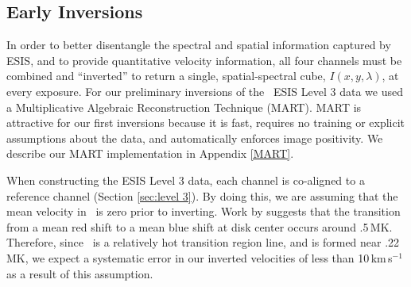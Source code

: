     
    
    \subsection{Early Inversions} \label{sec:inversions}
    	In order to better disentangle the spectral and spatial information captured by ESIS, and to provide quantitative velocity information, all four channels must be combined and ``inverted'' to return a single, spatial-spectral cube, $I(x,y,\lambda)$, at every exposure.
    	For our preliminary inversions of the \ov \  ESIS Level 3 data we used a Multiplicative Algebraic Reconstruction Technique (MART).
    	MART is attractive for our first inversions because it is fast, requires no training or explicit assumptions about the data, and automatically enforces image  positivity.
    	We describe our MART implementation in Appendix \ref{MART}.
    	
    	When constructing the ESIS Level 3 data, each channel is co-aligned to a reference channel (Section \ref{sec:level 3}).
    	By doing this, we are assuming that the mean velocity in \ov \ is zero prior to inverting.
    	Work by \citet{Peter1999} suggests that the transition from a mean red shift to a mean blue shift at disk center occurs around .5\,MK.
    	Therefore, since \ov \ is a relatively hot transition region line, and is formed near .22\,MK, we expect a systematic error in our inverted velocities of less than 10\,km\,s$^{-1}$ as a result of this assumption.
    	 
